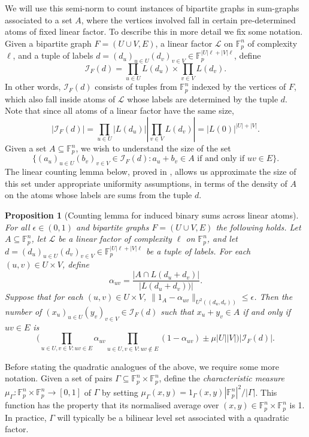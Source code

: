 \documentclass[12pt,oneside,british,a4wide]{amsart}
\newtheorem{proposition}[theorem]{Proposition}
\numberwithin{equation}{section}
\theoremstyle{definition}
\def\F{\mathbb{F}}
\def\e{\epsilon}
\newcommand{\calL}{\mathcal{L}}
\newcommand{\calI}{\mathcal{I}}
\begin{document}
We will use this semi-norm to count  instances of bipartite graphs in sum-graphs associated to a set $A$, where the vertices involved fall in certain pre-determined atoms of fixed linear factor.  To describe this in more detail we fix some notation. Given a bipartite graph  $F=(U\cup V, E)$,   a linear factor $\calL$ on $\F_p^n$ of complexity $\ell$, and a tuple of labels $d=(d_u)_{u\in U}(d_v)_{v\in V}\in \F_p^{|U|\ell+|V|\ell}$, define
$$
\calI_F(d)=\prod_{u\in U}L(d_u)\times \prod_{v\in V}L(d_v).
$$
In other words, $\calI_F(d)$ consists of tuples from $\F_p^n$ indexed by the vertices of $F$, which also fall inside atoms of $\calL$ whose labels are determined by the tuple $d$.  Note that since all atoms of a linear factor have the same size, 
$$
|\calI_F(d)|=\prod_{u\in U}|L(d_u)||\prod_{v\in V}L(d_v)|=|L(0)|^{|U|+|V|}.
$$
  Given a set $A\subseteq \F_p^n$, we wish to understand the size of the set
$$
\{(a_u)_{u\in U}(b_v)_{v\in V}\in \calI_F(d): a_u+b_v\in A\text{ if and only if }uv\in E\}.
$$
The linear counting lemma below,  proved in \cite[Proposition D.4]{Terry.2021d}, allows us approximate the size of this set under appropriate uniformity assumptions, in terms of the density of $A$ on the atoms whose labels are sums from the tuple $d$.

\begin{proposition}[Counting lemma for induced binary sums across linear atoms]\label{prop:countinggplinear}
For all $\e\in (0,1)$ and bipartite graphs $F=(U\cup V,E)$ the following holds.  Let $A\subseteq \mathbb{F}_p^n$,  let $\calL$ be a linear factor of complexity $\ell$ on $\F_p^n$, and let $d=(d_u)_{u\in U}(d_v)_{v\in V}\in \F_p^{|U|\ell+|V|\ell}$ be a tuple of labels. For each $(u,v)\in U\times V$, define 
$$
\alpha_{uv}=\frac{|A\cap L(d_u+d_v)|}{|L(d_u+d_v))|}.
$$
Suppose that for each $(u,v)\in U\times V$, $\|1_A-\alpha_{uv}\|_{U^2((d_u,d_v))}\leq \e$.  Then the number of $(x_u)_{u\in U}(y_v)_{v\in V}\in \calI_F(d)$ such that $x_u+y_v\in A$ if and only if $uv\in E$ is 
$$
\Big(\prod_{u\in U, v\in V: uv\in E}\alpha_{uv}\prod_{u\in U, v\in V: uv\notin E} (1-\alpha_{uv}) \pm \mu |U||V|\Big)|\calI_F(d)|.
$$
\end{proposition}
 
 
 Before stating the quadratic  analogues of the above, we require some more notation. Given a set of pairs $\Gamma\subseteq \F_p^n\times \F_p^n$, define the \emph{characteristic measure} $\mu_{\Gamma}: \F_p^n\times \F_p^n\rightarrow [0,1]$ of $\Gamma$ by setting $\mu_{\Gamma}(x,y)=1_{\Gamma}(x,y)|\F_p^{n}|^2/|\Gamma|$. This function has the property that its normalised average over $(x,y)\in \F_p^n\times \F_p^n$ is 1. In practice, $\Gamma$ will typically be a bilinear level set associated with a quadratic factor.
\end{document}
